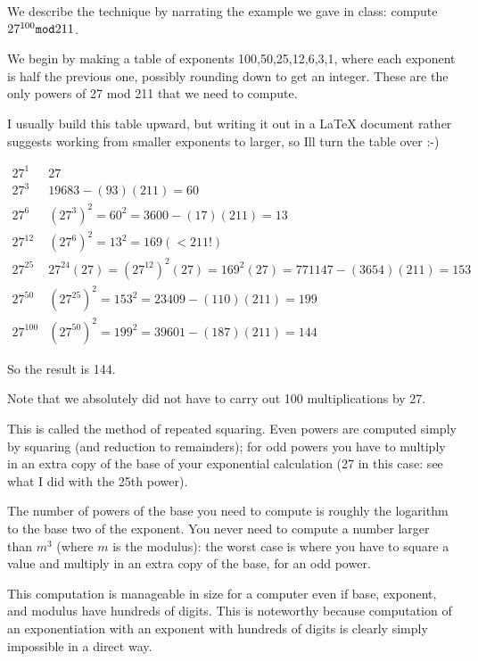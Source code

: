 \documentclass[12pt]{article}
\begin{document}
We describe the technique by narrating the example we gave in class:  compute $27^{100} {\tt mod} 211$.

We begin by making a table of exponents 100,50,25,12,6,3,1, where each exponent is half the previous one, possibly rounding down to get an integer.  These are the only powers of 27 mod 211 that we need to compute.

I usually build this table upward, but writing it out in a LaTeX document rather suggests working from smaller exponents to larger, so Ill turn the table over :-)

$\begin{array}{c|c}

27^1 & 27\\

27^3 & 19683-(93)(211) = 60\\

27^6 &  (27^3)^2 = 60^2 = 3600-(17)(211) = 13\\

27^{12} & (27^6)^2 = 13^2 = 169 (<211!) \\

27^{25} & 27^{24}(27) = (27^{12})^2(27) = 169^2(27) = 771147-(3654)(211) = 153 \\

27^{50} & (27^{25})^2 = 153^2 = 23409 - (110)(211) = 199 \\

27^{100} & (27^{50})^2 = 199^2 = 39601 - (187)(211) = 144


\end{array}$

So the result is 144.

Note that we absolutely did not have to carry out 100 multiplications by 27.

This is called the method of repeated squaring.  Even powers are computed simply by squaring (and reduction to remainders);  for odd powers you have to multiply in an extra copy of the base of your exponential calculation (27 in this case:  see what I did with the 25th power).

The number of powers of the base you need to compute is roughly the logarithm to the base two of the exponent.
You never need to compute a number larger than $m^3$ (where $m$ is the modulus):  the worst case is where you have to square a value and multiply in an extra copy of the base, for an odd power.

This computation is manageable in size for a computer even if base, exponent, and modulus have hundreds of digits.
This is noteworthy because computation of an exponentiation with an exponent with hundreds of digits is clearly simply impossible in a direct way.
\end{document}
